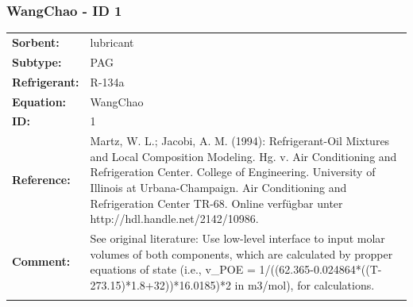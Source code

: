 \subsubsection{WangChao - ID 1}
%
\begin{tabular}[l]{|lp{11.5cm}|}
\hline
\addlinespace

\textbf{Sorbent:} & lubricant \\
\textbf{Subtype:} & PAG \\
\textbf{Refrigerant:} & R-134a \\
\textbf{Equation:} & WangChao \\
\textbf{ID:} & 1 \\
\textbf{Reference:} & Martz, W. L.; Jacobi, A. M. (1994): Refrigerant-Oil Mixtures and Local Composition Modeling. Hg. v. Air Conditioning and Refrigeration Center. College of Engineering. University of Illinois at Urbana-Champaign. Air Conditioning and Refrigeration Center TR-68. Online verfügbar unter http://hdl.handle.net/2142/10986. \\
\textbf{Comment:} & See original literature: Use low-level interface to input molar volumes of both components, which are calculated by propper equations of state (i.e., v\_POE =  1/((62.365-0.024864*((T-273.15)*1.8+32))*16.0185)*2 in m3/mol), for calculations. \\

\addlinespace
\hline
\end{tabular}
\newline

